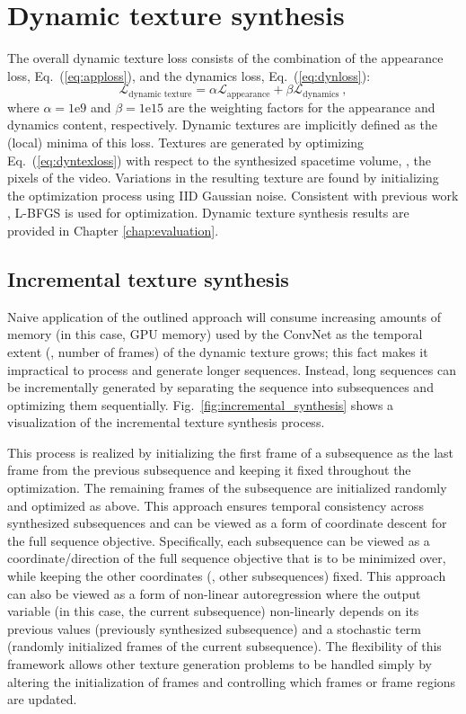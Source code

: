 {\section{Dynamic texture synthesis}\label{sec:texgen}
The overall dynamic texture loss consists of the combination of the appearance loss, Eq.\ (\ref{eq:apploss}),
and the dynamics loss, Eq.\ (\ref{eq:dynloss}):
\begin{equation}
   \mathcal{L}_\text{dynamic texture} = \alpha\mathcal{L}_\text{appearance} + \beta \mathcal{L}_\text{dynamics}\ , \label{eq:dyntexloss}
\end{equation}
where $\alpha = 1\mathrm{e}{9}$ and $\beta = 1\mathrm{e}{15}$ are the weighting factors for the
appearance and dynamics content, respectively.
Dynamic textures are implicitly defined as the (local) minima 
of this loss.
Textures are generated by optimizing Eq.\ 
(\ref{eq:dyntexloss}) with respect to the synthesized spacetime volume,
\ie, the pixels of the video.
Variations in the resulting texture are found by initializing the
optimization process using IID Gaussian noise.
Consistent with previous work \cite{gatys2015}, L-BFGS \cite{liu1989} is used for optimization. Dynamic texture synthesis results are provided in Chapter \ref{chap:evaluation}.

\subsection{Incremental texture synthesis}\label{sec:incremental_synthesis}

Naive application of the outlined approach will consume
increasing amounts of memory (in this case, GPU memory) used by the ConvNet as the temporal extent (\ie, number of frames) of the 
dynamic texture grows; this fact makes it impractical to process and generate longer sequences.
Instead, long sequences can be incrementally generated by
separating the sequence into subsequences and optimizing them 
sequentially. Fig.\ \ref{fig:incremental_synthesis}
shows a visualization of the incremental texture synthesis process.

This process is realized by initializing the first frame of a subsequence as the last 
frame from the previous subsequence and keeping it fixed throughout
the optimization.
The remaining frames of the subsequence are initialized randomly and
optimized as above.
This approach ensures temporal consistency across synthesized subsequences
and can be viewed as a form of coordinate descent for the full
sequence objective. Specifically, each subsequence can be viewed as a coordinate/direction of the full sequence objective that is to be minimized over, while keeping the other coordinates (\ie, other subsequences) fixed. This approach can also be viewed as a form of non-linear autoregression where the output variable (in this case, the current subsequence) non-linearly depends on its previous values (previously synthesized subsequence) and a stochastic term (randomly initialized frames of the current subsequence).
The flexibility of this framework allows other texture generation
problems to be handled simply by altering the 
initialization of frames and controlling which
frames or frame regions are updated.

}
